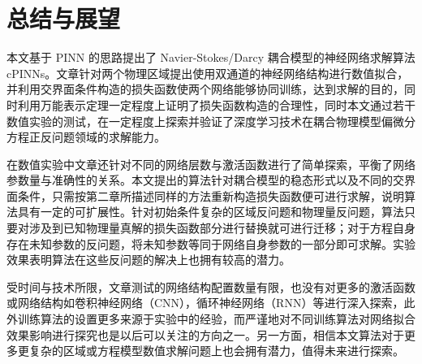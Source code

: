 
\chapter{总结与展望}

本文基于 PINN 的思路提出了 Navier-Stokes/Darcy 耦合模型的神经网络求解算法 cPINNs。文章针对两个物理区域提出使用双通道的神经网络结构进行数值拟合，并利用交界面条件构造的损失函数使两个网络能够协同训练，达到求解的目的，同时利用万能表示定理一定程度上证明了损失函数构造的合理性，同时本文通过若干数值实验的测试，在一定程度上探索并验证了深度学习技术在耦合物理模型偏微分方程正反问题领域的求解能力。

在数值实验中文章还针对不同的网络层数与激活函数进行了简单探索，平衡了网络参数量与准确性的关系。本文提出的算法针对耦合模型的稳态形式以及不同的交界面条件，只需按第二章所描述同样的方法重新构造损失函数便可进行求解，说明算法具有一定的可扩展性。针对初始条件复杂的区域反问题和物理量反问题，算法只要对涉及到已知物理量真解的损失函数部分进行替换就可进行迁移；对于方程自身存在未知参数的反问题，将未知参数等同于网络自身参数的一部分即可求解。实验效果表明算法在这些反问题的解决上也拥有较高的潜力。

受时间与技术所限，文章测试的网络结构配置数量有限，也没有对更多的激活函数或网络结构如卷积神经网络（CNN），循环神经网络（RNN）等进行深入探索，此外训练算法的设置更多来源于实验中的经验，而严谨地对不同训练算法对网络拟合效果影响进行探究也是以后可以关注的方向之一。另一方面，相信本文算法对于更多更复杂的区域或方程模型数值求解问题上也会拥有潜力，值得未来进行探索。